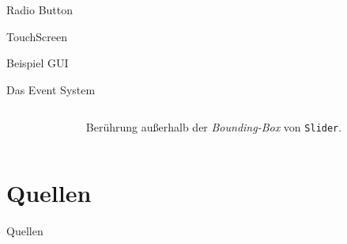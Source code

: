 \documentclass[12pt]{beamer}
\begin{document}
	\begin{frame}{Radio Button}
		\centering
	\end{frame}

	\begin{frame}{TouchScreen}
		\centering
		\begin{tikzpicture}
			
		\end{tikzpicture}
	\end{frame}

	\begin{frame}{Beispiel GUI}
		\centering
	\end{frame}

	\begin{frame}{Das Event System}
		\begin{columns}
			\begin{column}{0.6\textwidth}
				
			\end{column}
			\begin{column}{0.4\textwidth}
				\pause
				Berührung außerhalb der \emph{Bounding-Box} von \texttt{Slider}.
			\end{column}
		\end{columns}
		
	\end{frame}

	\section{Quellen}
	\begin{frame}{Quellen}
		\nocite{ts-holzinger}
		\nocite{I2C-spec_userManual}
		\nocite{stm32_refManual}
		\printbibliography
	\end{frame}
\end{document}
